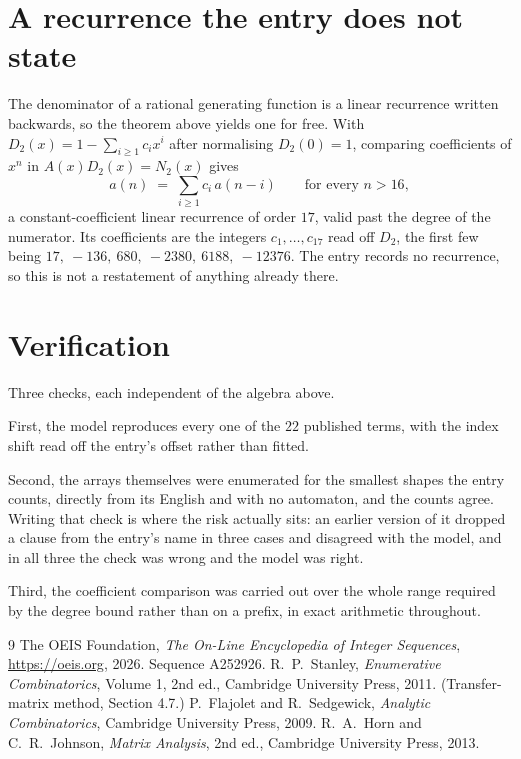 \documentclass[11pt,a4paper]{article}
\theoremstyle{plain}
\theoremstyle{definition}
\begin{document}
\section{A recurrence the entry does not state}

The denominator of a rational generating function is a linear recurrence written backwards, so
the theorem above yields one for free. With $D_2(x)=1-\sum_{i\ge1}c_ix^i$ after normalising
$D_2(0)=1$, comparing coefficients of $x^n$ in $A(x)D_2(x)=N_2(x)$ gives
\[
a(n)\;=\;\sum_{i\ge1}c_i\,a(n-i)\qquad\text{for every }n>16,
\]
a constant-coefficient linear recurrence of order $17$, valid past the degree of the
numerator. Its coefficients are the integers $c_1,\dots,c_{17}$ read off $D_2$, the first few being $17,\ -136,\ 680,\ -2380,\ 6188,\ -12376$. The entry records no recurrence, so this is not a restatement of anything
already there.

\section{Verification}

Three checks, each independent of the algebra above.

First, the model reproduces every one of the $22$ published terms, with the index shift
read off the entry's offset rather than fitted.

Second, the arrays themselves were enumerated for the smallest shapes the entry counts,
directly from its English and with no automaton, and the counts agree. Writing that check is
where the risk actually sits: an earlier version of it dropped a clause from the entry's name
in three cases and disagreed with the model, and in all three the check was wrong and the model
was right.

Third, the coefficient comparison was carried out over the whole range required by the degree
bound rather than on a prefix, in exact arithmetic throughout.

\begin{thebibliography}{9}
 The OEIS Foundation, \emph{The On-Line Encyclopedia of Integer
Sequences}, \url{https://oeis.org}, 2026. Sequence A252926.
 R.~P.~Stanley, \emph{Enumerative Combinatorics}, Volume 1, 2nd ed.,
Cambridge University Press, 2011. (Transfer-matrix method, Section 4.7.)
 P.~Flajolet and R.~Sedgewick, \emph{Analytic Combinatorics}, Cambridge
University Press, 2009.
 R.~A.~Horn and C.~R.~Johnson, \emph{Matrix Analysis}, 2nd ed., Cambridge
University Press, 2013.
\end{thebibliography}
\end{document}
